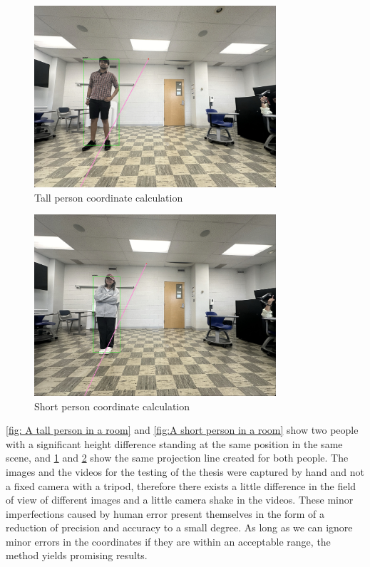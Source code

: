 \begin{figure}[H]
    \centering
    \includegraphics[width=0.8\textwidth]{vineet line.jpeg}
    \caption{Tall person coordinate calculation}
    \label{fig:Tall person coordinate calculation}
\end{figure}

\begin{figure}[H]
    \centering
    \includegraphics[width=0.8\textwidth]{rexha line.jpeg}
    \caption{Short person coordinate calculation}
    \label{fig:Short person coordinate calculation}
\end{figure}

\ref{fig: A tall person in a room} and \ref{fig:A short person in a room} show two people with a significant height difference standing at the same position in the same scene, and \ref{fig:Tall person coordinate calculation} and \ref{fig:Short person coordinate calculation} show the same projection line created for both people. The images and the videos for the testing of the thesis were captured by hand and not a fixed camera with a tripod, therefore there exists a little difference in the field of view of different images and a little camera shake in the videos. These minor imperfections caused by human error present themselves in the form of a reduction of precision and accuracy to a small degree. As long as we can ignore minor errors in the coordinates if they are within an acceptable range, the method yields promising results.\newline
